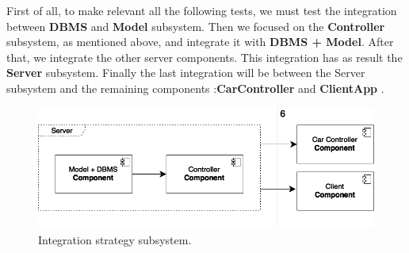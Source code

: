 First of all, to make relevant all the following tests, we must test the integration between \textbf{DBMS} and \textbf{Model} subsystem. Then we focused on the \textbf{Controller} subsystem, as mentioned above, and integrate it with \textbf{DBMS + Model}. After that, we integrate the other server components. This integration has as result the \textbf{Server} subsystem. Finally the last integration will be between the Server subsystem and the remaining components :\textbf{CarController} and \textbf{ClientApp} .




\begin{figure}[hp]
\centering
\includegraphics[width=400 pt]{resources/integrationSubSys.png}
\caption{\label{fig:SubSys}Integration strategy subsystem.}
\end{figure}

